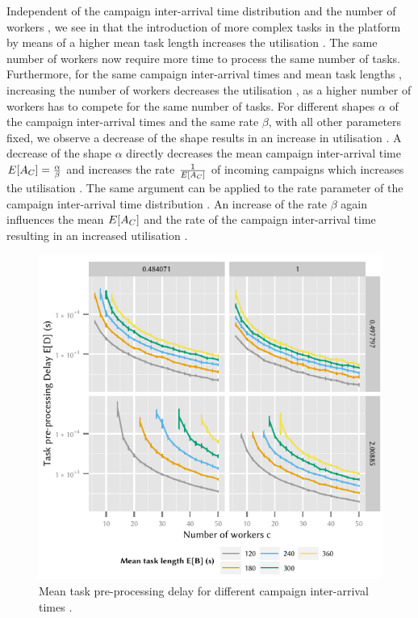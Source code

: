 Independent of the campaign inter-arrival time distribution \campaignIAT and the number of workers \numberOfWorkers, we see in  that the introduction of more complex tasks in the platform by means of a higher mean task length \meanTaskLength increases the utilisation \workerUtilization.
The same number of workers \numberOfWorkers now require more time to process the same number of tasks.
Furthermore, for the same campaign inter-arrival times \campaignIAT and mean task lengths \meanTaskLength, increasing the number of workers \numberOfWorkers decreases the utilisation \workerUtilization, as a higher number of workers has to compete for the same number of tasks.
For different shapes \(\alpha\) of the campaign inter-arrival times \campaignIAT and the same rate \(\beta\), with all other parameters fixed, we observe a decrease of the shape results in an increase in utilisation \workerUtilization.
A decrease of the shape \(\alpha\) directly decreases the mean campaign inter-arrival time \(E[A_C]=\frac{\alpha}{\beta}\) and increases the rate \(\frac{1}{E[A_C]}\) of incoming campaigns which increases the utilisation \workerUtilization. 
The same argument can be applied to the rate parameter of the campaign inter-arrival time distribution \campaignIAT.
An increase of the rate \(\beta\) again influences the mean \(E[A_C]\) and the rate of the campaign inter-arrival time \campaignIAT resulting in an increased utilisation \workerUtilization.

\begin{figure}
	\centering
	\includegraphics{cloud/crowdsourcing/numerical_evaluation/figures/parameter_task_delay}
	\caption{Mean task pre-processing delay \preTaskProcessingDelay for different campaign inter-arrival times \campaignIAT.}
	\label{fig:cloud:crowdsourcing:performance_evaluation:distributions:parameter_task_delay}
\end{figure}

